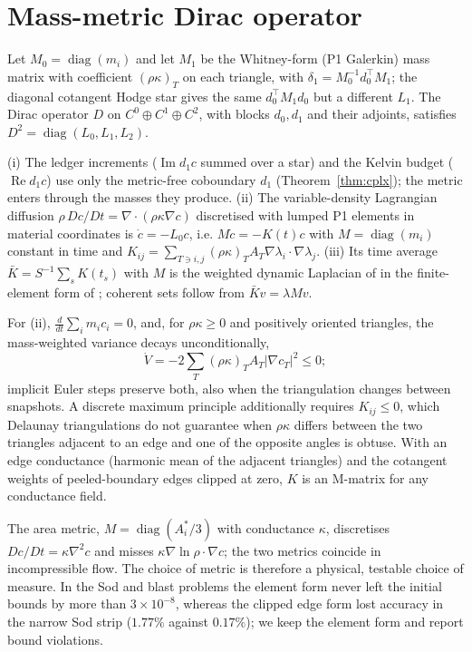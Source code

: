 \documentclass[11pt]{article}
\theoremstyle{definition}\newtheorem{definition}{Definition}\theoremstyle{remark}\newtheorem{remark}{Remark}
\newcommand{\im}{\operatorname{Im}}\newcommand{\re}{\operatorname{Re}}
\begin{document}
\section{Mass-metric Dirac operator}\label{sec:dirac}
Let $M_0=\operatorname{diag}(m_i)$ and let $M_1$ be the Whitney-form (P1 Galerkin) mass matrix with coefficient $(\rho\kappa)_T$ on each triangle, with $\delta_1=M_0^{-1}d_0^\top M_1$; the diagonal cotangent Hodge star gives the same $d_0^\top M_1d_0$ but a different $L_1$. The Dirac operator $D$ on $C^0\oplus C^1\oplus C^2$, with blocks $d_0,d_1$ and their adjoints, satisfies $D^2=\operatorname{diag}(L_0,L_1,L_2)$.
\begin{proposition}\label{prop:blocks}
(i) The ledger increments ($\im d_1c$ summed over a star) and the Kelvin budget ($\re d_1c$) use only the metric-free coboundary $d_1$ (Theorem~\ref{thm:cplx}); the metric enters through the masses they produce. (ii) The variable-density Lagrangian diffusion $\rho\,Dc/Dt=\nabla\cdot(\rho\kappa\nabla c)$ discretised with lumped P1 elements in material coordinates is $\dot c=-L_0c$, i.e. $M\dot c=-K(t)c$ with $M=\operatorname{diag}(m_i)$ constant in time and $K_{ij}=\sum_{T\ni i,j}(\rho\kappa)_TA_T\nabla\lambda_i\cdot\nabla\lambda_j$. (iii) Its time average $\bar K=S^{-1}\sum_sK(t_s)$ with $M$ is the weighted dynamic Laplacian of \citep{FroylandKwok2020} in the finite-element form of \citep{FroylandJunge2018}; coherent sets follow from $\bar Kv=\lambda Mv$.
\end{proposition}
\begin{proposition}
For (ii), $\frac{d}{dt}\sum_im_ic_i=0$, and, for $\rho\kappa\ge0$ and positively oriented triangles, the mass-weighted variance decays unconditionally, \[\dot V=-2\textstyle\sum_T(\rho\kappa)_TA_T|\nabla c_T|^2\le0;\] implicit Euler steps preserve both, also when the triangulation changes between snapshots. A discrete maximum principle additionally requires $K_{ij}\le0$, which Delaunay triangulations do not guarantee when $\rho\kappa$ differs between the two triangles adjacent to an edge and one of the opposite angles is obtuse. With an edge conductance (harmonic mean of the adjacent triangles) and the cotangent weights of peeled-boundary edges clipped at zero, $K$ is an M-matrix for any conductance field.
\end{proposition}
The area metric, $M=\operatorname{diag}(A^\ast_i/3)$ with conductance $\kappa$, discretises $Dc/Dt=\kappa\nabla^2c$ and misses $\kappa\nabla\ln\rho\cdot\nabla c$; the two metrics coincide in incompressible flow. The choice of metric is therefore a physical, testable choice of measure. In the Sod and blast problems the element form never left the initial bounds by more than $3\times10^{-8}$, whereas the clipped edge form lost accuracy in the narrow Sod strip ($1.77\%$ against $0.17\%$); we keep the element form and report bound violations.
\end{document}
